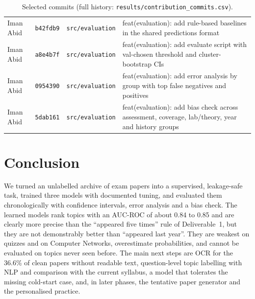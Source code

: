 \documentclass[11pt,a4paper]{article}
\newcommand{\auc}{AUC-ROC}
\begin{document}
\begin{table}[!htb]
\begin{tabular}{llp{2.6cm}p{6.6cm}}
Iman Abid & \texttt{b42fdb9} & \texttt{src/evaluation} & feat(evaluation): add rule-based baselines in the shared predictions format \\
Iman Abid & \texttt{a8e4b7f} & \texttt{src/evaluation} & feat(evaluation): add evaluate script with val-chosen threshold and cluster-bootstrap CIs \\
Iman Abid & \texttt{0954390} & \texttt{src/evaluation} & feat(evaluation): add error analysis by group with top false negatives and positives \\
Iman Abid & \texttt{5dab161} & \texttt{src/evaluation} & feat(evaluation): add bias check across assessment, coverage, lab/theory, year and history groups \\
\bottomrule
\end{tabular}
\caption{Selected commits (full history: \texttt{results/contribution\_commits.csv}).}
\label{tab:selected}
\end{table}

\section{Conclusion}
\label{sec:concl}

We turned an unlabelled archive of exam papers into a supervised, leakage-safe task, trained three models with documented
tuning, and evaluated them chronologically with confidence intervals, error analysis and a bias check. The learned models
rank topics with an \auc{} of about 0.84 to 0.85 and are clearly more precise than the ``appeared five times'' rule of
Deliverable~1, but they are not demonstrably better than ``appeared last year''. They are weakest on quizzes and on
Computer Networks, overestimate probabilities, and cannot be evaluated on topics never seen before. The main next steps are
OCR for the 36.6\% of clean papers without readable text, question-level topic labelling with NLP and comparison with the current syllabus,
a model that tolerates the missing cold-start case, and, in later phases, the tentative paper generator and the personalised
practice.
\end{document}
